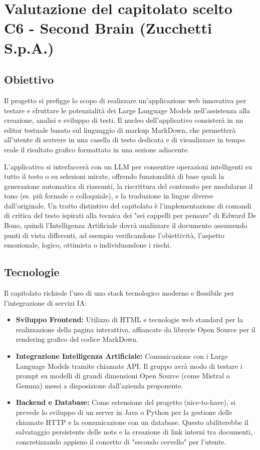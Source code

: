 \documentclass[a4paper, 10pt, colorlinks=true, linkcolor=black, urlcolor=blue, citecolor=blue, hidelinks]{article}
\begin{document}
\section{Valutazione del capitolato scelto C6 - Second Brain (Zucchetti S.p.A.)}


\subsection{Obiettivo}
Il progetto si prefigge lo scopo di realizzare un'applicazione web innovativa per testare e sfruttare le potenzialità dei Large Language Models nell'assistenza alla creazione, analisi e sviluppo di testi. Il nucleo dell'applicativo consisterà in un editor testuale basato sul linguaggio di markup MarkDown, che permetterà all'utente di scrivere in una casella di testo dedicata e di visualizzare in tempo reale il risultato grafico formattato in una sezione adiacente.

L'applicativo si interfaccerà con un LLM per consentire operazioni intelligenti su tutto il testo o su selezioni mirate, offrendo funzionalità di base quali la generazione automatica di riassunti, la riscrittura del contenuto per modularne il tono (es. più formale o colloquiale), e la traduzione in lingue diverse dall'originale. Un tratto distintivo del capitolato è l'implementazione di comandi di critica del testo ispirati alla tecnica dei "sei cappelli per pensare" di Edward De Bono, quindi l'Intelligenza Artificiale dovrà analizzare il documento assumendo punti di vista differenti, ad esempio verificandone l'obiettività, l'aspetto emozionale, logico, ottimista o individuandone i rischi. 

\subsection{Tecnologie}
Il capitolato richiede l'uso di uno stack tecnologico moderno e flessibile per l'integrazione di servizi IA:
\begin{itemize}
    \item \textbf{Sviluppo Frontend:} Utilizzo di HTML e tecnologie web standard per la realizzazione della pagina interattiva, affiancate da librerie Open Source per il rendering grafico del codice MarkDown.
    \item \textbf{Integrazione Intelligenza Artificiale:} Comunicazione con i Large Language Models tramite chiamate API. Il gruppo avrà modo di testare i prompt su modelli di grandi dimensioni Open Source (come Mistral o Gemma) messi a disposizione dall'azienda proponente.
    \item \textbf{Backend e Database:} Come estensione del progetto (nice-to-have), si prevede lo sviluppo di un server in Java o Python per la gestione delle chiamate HTTP e la comunicazione con un database. Questo abiliterebbe il salvataggio persistente delle note e la creazione di link interni tra documenti, concretizzando appieno il concetto di "secondo cervello" per l'utente.
\end{itemize}
\end{document}
